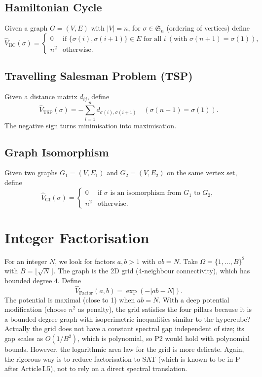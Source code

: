 \documentclass[11pt,a4paper]{article}
\begin{document}
\subsection{Hamiltonian Cycle}
Given a graph $G = (V,E)$ with $|V|=n$, for $\sigma\in\mathfrak{S}_n$ (ordering of vertices) define
\[
\hat{V}_{\mathrm{HC}}(\sigma) = \begin{cases}
0 & \text{if } \{\sigma(i),\sigma(i+1)\}\in E \text{ for all } i\ (\text{with }\sigma(n+1)=\sigma(1)),\\
n^2 & \text{otherwise}.
\end{cases}
\]

\subsection{Travelling Salesman Problem (TSP)}
Given a distance matrix $d_{ij}$, define
\[
\hat{V}_{\mathrm{TSP}}(\sigma) = -\sum_{i=1}^{n} d_{\sigma(i),\sigma(i+1)}\quad (\sigma(n+1)=\sigma(1)).
\]
The negative sign turns minimisation into maximisation.

\subsection{Graph Isomorphism}
Given two graphs $G_1 = (V,E_1)$ and $G_2 = (V,E_2)$ on the same vertex set, define
\[
\hat{V}_{\mathrm{GI}}(\sigma) = \begin{cases}
0 & \text{if } \sigma \text{ is an isomorphism from } G_1 \text{ to } G_2,\\
n^2 & \text{otherwise}.
\end{cases}
\]

\section{Integer Factorisation}

For an integer $N$, we look for factors $a,b>1$ with $ab=N$. Take $\Omega = \{1,\ldots,B\}^2$ with $B = \lfloor\sqrt{N}\rfloor$. The graph is the 2D grid (4‑neighbour connectivity), which has bounded degree $4$. Define
\[
\hat{V}_{\mathrm{Factor}}(a,b) = \exp(-|ab - N|).
\]
The potential is maximal (close to 1) when $ab=N$. With a deep potential modification (choose $n^2$ as penalty), the grid satisfies the four pillars because it is a bounded‑degree graph with isoperimetric inequalities similar to the hypercube? Actually the grid does not have a constant spectral gap independent of size; its gap scales as $O(1/B^2)$, which is polynomial, so P2 would hold with polynomial bounds. However, the logarithmic area law for the grid is more delicate. Again, the rigorous way is to reduce factorisation to SAT (which is known to be in P after Article I.5), not to rely on a direct spectral translation.
\end{document}
